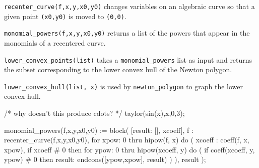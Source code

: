 {\tt recenter_curve(f,x,y,x0,y0)} changes variables on an algebraic curve
so that a given point {\tt (x0,y0)} is moved to {\tt (0,0)}.

{\tt monomial_powers(f,x,y,x0,y0)} returns a list of the powers that
appear in the monomials of a recentered curve.

{\tt lower_convex_points(list)} takes a {\tt monomial_powers} list as
input and returns the subset corresponding to the lower convex hull
of the Newton polygon.

{\tt lower_convex_hull(list, x)} is used by {\tt newton_polygon}
to graph the lower convex hull.

\vfill\eject


\begin{maximablock}
/* why doesn't this produce cdots? */
taylor(sin(x),x,0,3);
\end{maximablock}

\begin{maximacommon}
monomial_powers(f,x,y,x0,y0) := block(
  [result: [], xcoeff],
  f : recenter_curve(f,x,y,x0,y0),
  for xpow: 0 thru hipow(f, x) do (
    xcoeff : coeff(f, x, xpow),
    if xcoeff # 0 then
       for ypow: 0 thru hipow(xcoeff, y) do (
          if coeff(xcoeff, y, ypow) # 0 then
             result: endcons([ypow,xpow], result)
       )
  ),
  result
);
\end{maximacommon}

